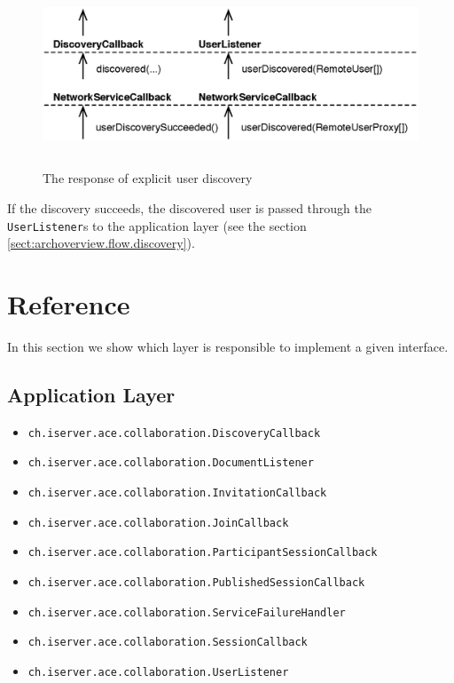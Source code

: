 \begin{figure}[H]
 \centering
 \includegraphics[width=15.63cm,height=5.50cm]{../images/finalreport/architecture_flows/explicitdiscovery_response.eps}
 \caption{The response of explicit user discovery}
 \label{fig:archoverview.flow.explicitdiscoveryresponse}
\end{figure}

If the discovery succeeds, the discovered user is passed through the
\texttt{UserListener}s to the application layer (see the section
\ref{sect:archoverview.flow.discovery}).



\section{Reference}
In this section we show which layer is responsible to implement a given
interface.

\subsection{Application Layer}
\begin{itemize}
 \item \texttt{ch.iserver.ace.collaboration.DiscoveryCallback}
 \item \texttt{ch.iserver.ace.collaboration.DocumentListener}
 \item \texttt{ch.iserver.ace.collaboration.InvitationCallback}
 \item \texttt{ch.iserver.ace.collaboration.JoinCallback}
 \item \texttt{ch.iserver.ace.collaboration.ParticipantSessionCallback}
 \item \texttt{ch.iserver.ace.collaboration.PublishedSessionCallback}
 \item \texttt{ch.iserver.ace.collaboration.ServiceFailureHandler}
 \item \texttt{ch.iserver.ace.collaboration.SessionCallback}
 \item \texttt{ch.iserver.ace.collaboration.UserListener}
\end{itemize}

